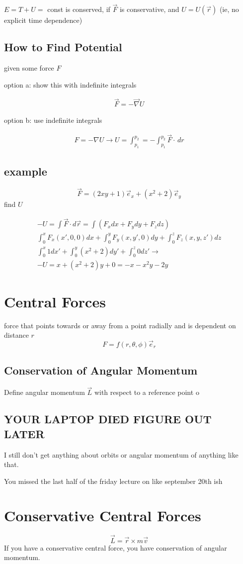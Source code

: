 \documentclass[fleqn]{report}
\newcommand{\equations} [1] {
\begin{gather*}
#1
\end{gather*}
}
\begin{document}
$E = T + U =$ const is conserved, if $\vec F$ is conservative, and 
$U = U(\vec r)$ (ie, no explicit time dependence)

\subsection{How to Find Potential}
given some force $F$

option a: show this with indefinite integrals
\equations{
	\vec F = - \vec \nabla U
}


option b: use indefinite integrals
\equations{
	F = - \nabla U 
	\rightarrow U = \int^{p_2}_{p_1} = -\int^{p_2}_{p_1} \vec F \cdot \, dr
}

\subsection{example}
\[
	\vec F = (2xy + 1) \vec e_x + 
	(x^2 + 2) \vec e_y
\]
find $U$

\equations{
	-U = \int \vec F \cdot d \vec r = 
	\int (F_x dx + F_y dy + F_z dz)
	\\
	\int^x_0 F_x(x', 0, 0) dx + \int^y_0 F_y(x, y', 0) dy + \int^z_0 F_z(x,y, z') dz
	\\
	\int^x_0 1 dx' + \int^y_0 (x^2 + 2) dy' + \int^z_0 0 dz'
	\rightarrow
	\\
	-U = x + (x^2 + 2)y + 0 =
	-x - x^2y - 2y
}

\section{Central Forces}
force that points towards or away from a point radially and is dependent on distance $r$
\[
	F = f(r, \theta, \phi) \vec e_r
\]

\subsection{Conservation of Angular Momentum}
Define angular momentum $\vec L$ with respect to a reference point $\mathrm{o}$

\subsection{YOUR LAPTOP DIED FIGURE OUT LATER}
I still don't get anything about orbits or angular momentum of anything like that.

You missed the last half of the friday lecture on like september 20th ish

\section{Conservative Central Forces}
\[
\vec L = \vec r \times m \vec v
\]
If you have a conservative central force, you have conservation of angular momentum.
\end{document}
